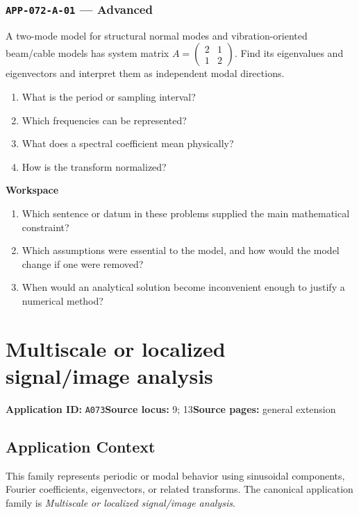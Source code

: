\documentclass[11pt]{book}
\newcommand{\pid}[1]{\texttt{#1}}
\newcommand{\workspace}{\par\vspace{0.7in}\hrulefill\par\vspace{0.55in}\hrulefill\par}
\begin{document}
\subsection*{\pid{APP-072-A-01} — Advanced}
\begin{problembox}
A two-mode model for structural normal modes and vibration-oriented beam/cable models has system matrix $A=\begin{pmatrix}2&1\\1&2\end{pmatrix}$. Find its eigenvalues and eigenvectors and interpret them as independent modal directions.
\end{problembox}
\begin{promptbox}\begin{enumerate}
\item What is the period or sampling interval?
\item Which frequencies can be represented?
\item What does a spectral coefficient mean physically?
\item How is the transform normalized?
\end{enumerate}\end{promptbox}
\textbf{Workspace}\workspace
\begin{reflectionbox}\begin{enumerate}
\item Which sentence or datum in these problems supplied the main mathematical constraint?
\item Which assumptions were essential to the model, and how would the model change if one were removed?
\item When would an analytical solution become inconvenient enough to justify a numerical method?
\end{enumerate}\end{reflectionbox}
\chapter{Multiscale or localized signal/image analysis}\label{app:A073}
\textbf{Application ID:} \pid{A073}\quad \textbf{Source locus:} 9; 13\quad \textbf{Source pages:} general extension
\section*{Application Context}
This family represents periodic or modal behavior using sinusoidal components, Fourier coefficients, eigenvectors, or related transforms. The canonical application family is \emph{Multiscale or localized signal/image analysis}.
\end{document}
